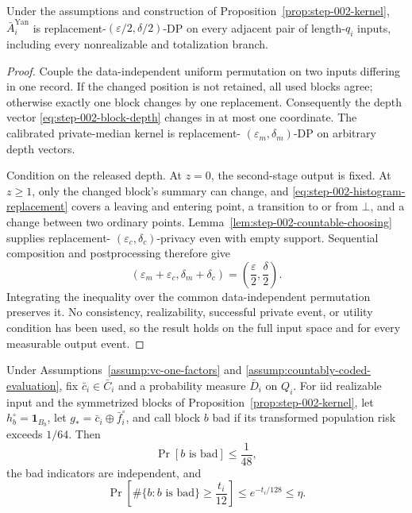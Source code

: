 \begin{proposition}
\label{prop:step-002-factor-privacy}
Under the assumptions and construction of
Proposition~\ref{prop:step-002-kernel}, \(\bar A_i^{\mathrm{Yan}}\) is
replacement-\((\varepsilon/2,\delta/2)\)-DP on every adjacent pair of
length-\(q_i\) inputs, including every nonrealizable and totalization branch.
\end{proposition}

\begin{proof}
Couple the data-independent uniform permutation on two inputs differing in
one record.  If the changed position is not retained, all used blocks agree;
otherwise exactly one block changes by one replacement.  Consequently the
depth vector \eqref{eq:step-002-block-depth} changes in at most one
coordinate.  The calibrated private-median kernel is replacement-
\((\varepsilon_m,\delta_m)\)-DP on arbitrary depth vectors.

Condition on the released depth.  At \(z=0\), the second-stage output is
fixed.  At \(z\ge1\), only the changed block's summary can change, and
\eqref{eq:step-002-histogram-replacement} covers a leaving and entering
point, a transition to or from \(\bot\), and a change between two ordinary
points.  Lemma~\ref{lem:step-002-countable-choosing} supplies replacement-
\((\varepsilon_c,\delta_c)\)-privacy even with empty support.  Sequential
composition and postprocessing therefore give
\begin{equation}\label{eq:step-002-factor-privacy}
(\varepsilon_m+\varepsilon_c,\delta_m+\delta_c)
=\left(\frac\varepsilon2,\frac\delta2\right).
\end{equation}
Integrating the inequality over the common data-independent permutation
preserves it.  No consistency, realizability, successful private event, or
utility condition has been used, so the result holds on the full input
space and for every measurable output event.
\end{proof}

\begin{lemma}
\label{lem:step-002-good-cores}
Under Assumptions~\ref{assump:vc-one-factors} and
\ref{assump:countably-coded-evaluation}, fix
\(\bar c_i\in\bar C_i\) and a probability measure \(\bar D_i\) on \(Q_i\).
For iid realizable input and the symmetrized blocks of
Proposition~\ref{prop:step-002-kernel}, let
\(h_b^\circ=\mathbf1_{B_b}\), let
\(g_*=\bar c_i\oplus\bar f_i^\circ\), and call block \(b\) bad if its
transformed population risk exceeds \(1/64\).  Then
\begin{equation}\label{eq:step-002-marginal-bad-core}
\Pr[b\text{ is bad}]\le\frac1{48},
\end{equation}
the bad indicators are independent, and
\begin{equation}\label{eq:step-002-bad-core-tail}
\Pr\!\left[\#\{b:b\text{ is bad}\}\ge\frac{t_i}{12}\right]
\le e^{-t_i/128}\le\eta.
\end{equation}
\end{lemma}

